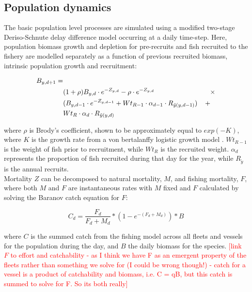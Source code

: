 \documentclass[review]{elsarticle}
\begin{document}
\subsection{Population dynamics}

The basic population level processes are simulated using a modified two-stage
Deriso-Schnute delay difference model \citep{Deriso1980, Schnute1985,
	Dichmont2003} occurring at a daily time-step. Here, population biomass
growth and depletion for pre-recruits and fish recruited to the fishery are
modelled separately as a function of previous recruited biomass, intrinsic
population growth and recruitment:

\begin{equation*}
	\begin{split}
	B_{y,d+1} = &\\
	& (1 + \rho) B_{y,d} \cdot e^{-Z_{y,d}} - \rho \cdot e^{-Z_{y,d}} \hspace{2.9cm}
	\times \\  
	& (B_{y,d-1} \cdot e^{-Z_{y,d-1}} + Wt_{R-1} \cdot \alpha_{d-1} \cdot R_{\tilde{y}(y,d-1)})
	\hspace{0.4cm} + \\
	& Wt_{R} \cdot \alpha_{d} \cdot R_{\tilde{y}(y,d)} 
	\end{split}
\end{equation*}

where $\rho$ is Brody's coefficient, shown to be approximately equal to
$exp(-K)$, where $K$ is the growth rate from a von bertalanffy logistic growth
model \citep{Schnute1985}. $Wt_{R-1}$ is the weight of fish prior to
recruitment, while $Wt_{R}$ is the recruited weight. $\alpha_{d}$ represents
the proportion of fish recruited during that day for the year, while
$R_{\tilde{y}}$ is the annual recruits. \\

Mortality $Z$ can be decomposed to natural mortality, $M$, and fishing
mortality, $F$, where both $M$ and $F$ are instantaneous rates with $M$ fixed
and $F$ calculated by solving the Baranov catch equation \citep{Hilborn1992b}
for $F$:

\begin{equation*}
C_{d} = \frac{F_{d}}{F_{d}+M_{d}} * (1 - e^{-(F_{d} + M_{d})}) * B
\end{equation*}

where $C$ is the summed catch from the fishing model across all fleets and
vessels for the population during the day, and $B$ the daily biomass for the
species. \textcolor{red}{[link $F$ to effort and catchability - as I think we
	have F as an emergent property of the fleets rather than something we
	solve for (I could be wrong though!) - catch for a vessel is a product of
	catchability and biomass, i.e. C = qB, but this catch is summed to
	solve for F. So its both really]}\\
\end{document}
